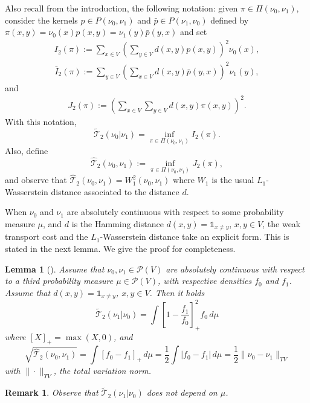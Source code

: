 \documentclass[11pt]{amsart}
\newtheorem{lem}[equation]{Lemma}
\newtheorem{rem}[equation]{Remark}
\numberwithin{equation}{section}
\begin{document}
Also recall from the introduction, the following notation: given $\pi \in \Pi(\nu_0,\nu_1)$, consider the kernels $p\in P(\nu_{0},\nu_{1})$ and $\bar{p}\in P(\nu_{1},\nu_{0})$ defined by $\pi(x,y)=\nu_0(x)p(x,y) = \nu_{1}(y)\bar{p}(y,x) $ and set
\begin{eqnarray}
I_2(\pi):=  \sum_{x \in V} \left( \sum_{y \in V} d(x,y) p(x,y) \right)^2 \nu_0(x),
\end{eqnarray}
\begin{eqnarray*}
\bar{I}_2(\pi):=  \sum_{y \in V} \left( \sum_{x \in V} d(x,y) \bar{p}(y,x) \right)^2 \nu_1(y),
\end{eqnarray*}
and
\begin{eqnarray*}
J_2(\pi):=   \left(\sum_{x \in V} \sum_{y \in V} d(x,y)\pi(x,y) \right)^2.
\end{eqnarray*}
With this notation, 
$${\widetilde{\mathcal{T}}}_{2}(\nu_{0}|\nu_{1})=\inf_{\pi \in \Pi(\nu_{0},\nu_{1})}I_{2}(\pi) .
$$
Also, define
$$
\hat {\mathcal{T}}_{2}(\nu_0 ,\nu_1 ) :=\inf_{\pi \in \Pi(\nu_{0},\nu_{1})}J_{2}(\pi),
$$
and observe that $\hat {\mathcal{T}}_{2}(\nu_0 ,\nu_1 )=W_1^2(\nu_{0},\nu_{1})$ where $W_1$ is the usual $L_1$-Wasserstein distance associated to the distance $d$.

When $\nu_0$ and $\nu_1$ are absolutely continuous with respect to some probability measure $\mu$, and $d$ is the Hamming distance $d(x,y)={\mathds{1}}_{x \neq y}$, $x,y \in V$,  the weak transport cost  and the   $L_1$-Wasserstein distance
take an explicit form. This is stated in the next lemma. We give the proof for completeness.

\begin{lem}[\cite{GRST}] \label{lem:postive}
Assume that $\nu_0, \nu_1 \in \mathcal{P}(V)$ are absolutely continuous with respect to a third probability measure 
$\mu \in  \mathcal{P}(V)$, with respective densities $f_0$ and $f_1$. Assume that $d(x,y)={\mathds{1}}_{x \neq y}$, $x,y \in V$. Then it holds
$$
{\widetilde{\mathcal{T}}}_2(\nu_1 |\nu_0 ) = \int \left[1-\frac{f_1}{f_0} \right]_+^2 f_0\,d\mu 
$$
where $[X]_+=\max(X,0)$, and 
$$
\sqrt{\hat {\mathcal{T}}_{2}(\nu_0 ,\nu_1 )}=\int \left[f_0-f_1 \right]_+ \,d\mu =\frac 12 \int \left|f_0-f_1 \right| \,d\mu = \frac 12 \|\nu_0-\nu_1\|_{TV}
$$
with $\|\cdot  \|_{TV}$, the total variation norm.
\end{lem}

\begin{rem}
Observe that ${\widetilde{\mathcal{T}}}_2(\nu_1 |\nu_0 )$ does not depend on $\mu$.
\end{rem}
\end{document}
